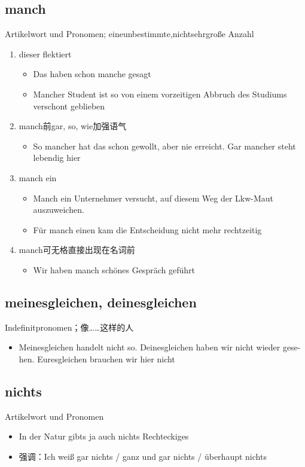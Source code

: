 \documentclass[UTF8]{report}
\begin{document}
\subsection{manch}
Artikelwort und Pronomen; eineunbestimmte,nichtsehrgroße Anzahl
\begin{enumerate}
    \item dieser flektiert
    \begin{itemize}
        \item Das haben schon manche gesagt
        \item Mancher Student ist so von einem vorzeitigen Abbruch des Studiums verschont geblieben
    \end{itemize}
    \item manch前gar, so, wie加强语气
    \begin{itemize}
        \item So mancher hat das schon gewollt, aber nie erreicht. Gar mancher steht lebendig hier
    \end{itemize}
    \item manch ein
    \begin{itemize}
        \item Manch ein Unternehmer versucht, auf diesem Weg der Lkw-Maut auszuweichen.
        \item Für manch einen kam die Entscheidung nicht mehr rechtzeitig
    \end{itemize}
    \item manch可无格直接出现在名词前
    \begin{itemize}
        \item Wir haben manch schönes Gespräch geführt
    \end{itemize}
\end{enumerate}


\subsection{meinesgleichen, deinesgleichen }
Indefinitpronomen；像……这样的人
\begin{itemize}
    \item Meinesgleichen handelt nicht so. Deinesgleichen haben wir nicht wieder gese- hen. Euresgleichen brauchen wir hier nicht
\end{itemize}


\subsection{nichts}
Artikelwort und Pronomen
\begin{itemize}
    \item In der Natur gibts ja auch nichts Rechteckiges
    \item 强调：Ich weiß gar nichts / ganz und gar nichts / überhaupt nichts
\end{itemize}
\end{document}
